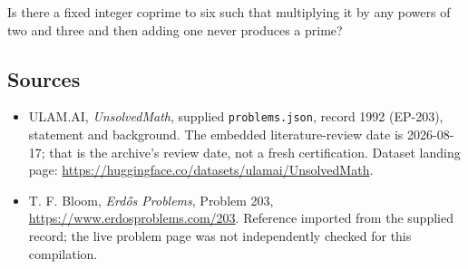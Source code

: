 \documentclass[11pt,a4paper]{article}
\begin{document}
Is there a fixed integer coprime to six such that multiplying it by any powers of two and three and then adding one never produces a prime?

\subsection{Sources}

{\small

\begin{itemize}

\item[\hypertarget{source:1992:1}{S1}] ULAM.AI, \emph{UnsolvedMath}, supplied \texttt{problems.json}, record 1992 (EP-203), statement and background. The embedded literature-review date is 2026-08-17; that is the archive’s review date, not a fresh certification. Dataset landing page: \url{https://huggingface.co/datasets/ulamai/UnsolvedMath}.

\item[\hypertarget{source:1992:2}{S2}] T. F. Bloom, \emph{Erdős Problems}, Problem 203, \url{https://www.erdosproblems.com/203}. Reference imported from the supplied record; the live problem page was not independently checked for this compilation.

\end{itemize}

}

\label{end:1992}
\end{document}
